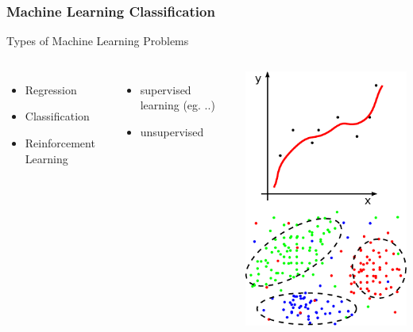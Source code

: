 \begin{frame}
  \frametitle{Machine Learning Classification}
  Types of Machine Learning Problems
  \begin{columns}
    \begin{itemize}
    \item Regression
    \item Classification
    \item Reinforcement Learning
    \end{itemize}
    \begin{itemize}
    \item supervised learning (eg. ..)
    \item unsupervised
    \end{itemize}
    \includegraphics[width=\textwidth]{graphics/ml.pdf}
  \end{columns}
\end{frame}

